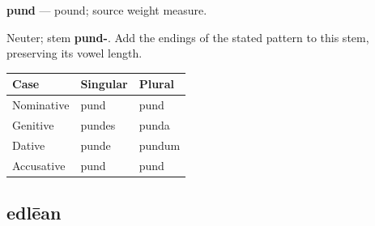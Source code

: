 \par\begin{minipage}{\linewidth}\raggedright
\textbf{pund} — pound; source weight measure.

Neuter; stem \textbf{pund-}. Add the endings of the stated pattern to this stem, preserving its vowel length.

\par\begingroup
\fontsize{10.5}{13.2}\selectfont
\setlength{\LTleft}{0pt}\setlength{\LTright}{\fill}
\noindent
\begin{tabular}{@{}>{\raggedright\arraybackslash}p{39.46mm}>{\raggedright\arraybackslash}p{39.46mm}>{\raggedright\arraybackslash}p{39.46mm}@{}}
\toprule
\textbf{Case} & \textbf{Singular} & \textbf{Plural} \\
\midrule
Nominative & pund & pund \\
Genitive & pundes & punda \\
Dative & punde & pundum \\
Accusative & pund & pund \\
\bottomrule
\end{tabular}
\par\endgroup

\end{minipage}\par
{}
\subsection*{edlēan}

